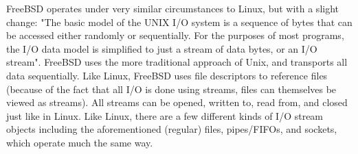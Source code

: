 \documentclass[10pt,draftclsnofoot,onecolumn]{IEEEtran}
\begin{document}
    \par
    FreeBSD operates under very similar circumstances to Linux, but with a slight change: "The basic model of the UNIX I/O system is a sequence of bytes that can be accessed either randomly or sequentially. For the purposes of most programs, the I/O data model is simplified to just a stream of data bytes, or an I/O stream"\cite{mckusick_neville-neil_watson_mckusick_2015}. FreeBSD uses the more traditional approach of Unix, and transports all data sequentially.
    Like Linux, FreeBSD uses file descriptors to reference files (because of the fact that all I/O is done using streams, files can themselves be viewed as streams). All streams can be opened, written to, read from, and closed just like in Linux. Like Linux, there are a few different kinds of I/O stream objects including the aforementioned (regular) files, pipes/FIFOs, and sockets, which operate much the same way.\newline
    \par
\end{document}
